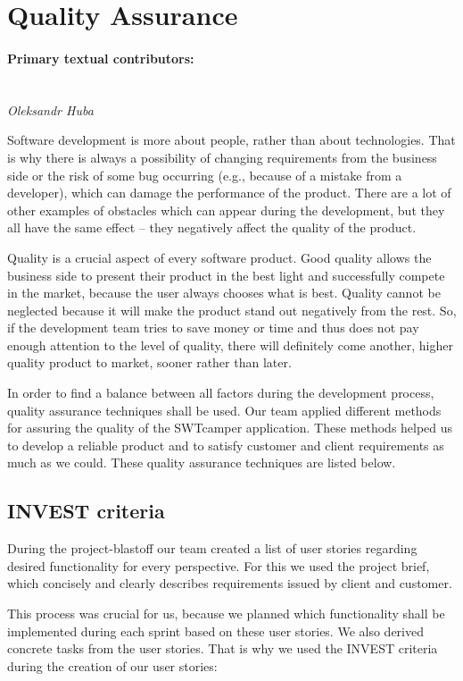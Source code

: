 \section{Quality Assurance}
\label{sec:quality_assurance}

\paragraph{Primary textual contributors:}
\mbox{}\\\emph{Oleksandr Huba}

Software development is more about people, rather than about technologies. That is why there is always a possibility of changing requirements from the business side or the risk of some bug occurring (e.g., because of a mistake from a developer), which can damage the performance of the product. There are a lot of other examples of obstacles which can appear during the development, but they all have the same effect – they negatively affect the quality of the product.

Quality is a crucial aspect of every software product. Good quality allows the business side to present their product in the best light and successfully compete in the market, because the user always chooses what is best. Quality cannot be neglected because it will make the product stand out negatively from the rest. So, if the development team tries to save money or time and thus does not pay enough attention to the level of quality, there will definitely come another, higher quality product to market, sooner rather than later.

In order to find a balance between all factors during the development process, quality assurance techniques shall be used. Our team applied different methods for assuring the quality of the SWTcamper application. These methods helped us to develop a reliable product and to satisfy customer and client requirements as much as we could. These quality assurance techniques are listed below.

\subsection{INVEST criteria}
During the project-blastoff our team created a list of user stories regarding desired functionality for every perspective. For this we used the project brief, which concisely and clearly describes requirements issued by client and customer.

This process was crucial for us, because we planned which functionality shall be implemented during each sprint based on these user stories. We also derived concrete tasks from the user stories. That is why we used the INVEST criteria during the creation of our user stories:

